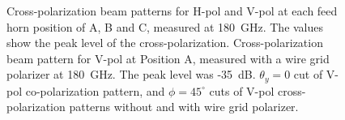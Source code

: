 \documentclass[journal]{IEEEtran}
\begin{document}
\begin{figure}[!t]
\caption{%
\protect{} Cross-polarization beam patterns for H-pol and V-pol at each feed horn position of A, B and C, measured at 180~GHz. The values show the peak level of the cross-polarization.
\protect{} Cross-polarization beam pattern for V-pol at Position A, measured with a wire grid polarizer at 180~GHz. The peak level was -35~dB.
\protect{} $\theta_y = 0$ cut of V-pol co-polarization pattern, and $\phi = 45^\circ$ cuts of V-pol cross-polarization patterns without and with wire grid polarizer.
}
\label{fig:HVpol_Xpol_180G}
\end{figure}
%
%
\end{document}
